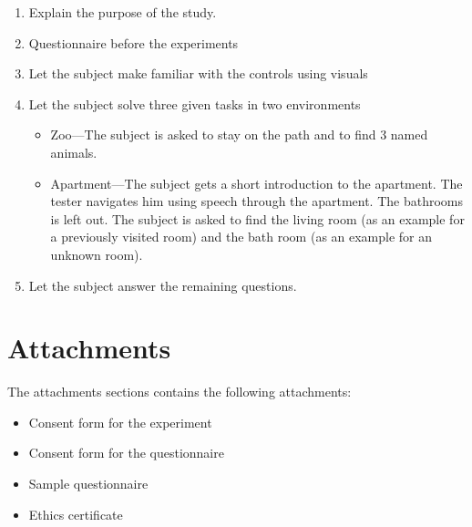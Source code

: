 \documentclass{article}
\begin{document}
\begin{enumerate}
  \item Explain the purpose of the study.
  \item Questionnaire before the experiments
  \item Let the subject make familiar with the controls using visuals
  \item Let the subject solve three given tasks in two environments
  \begin{itemize}
  \item Zoo---The subject is asked to stay on the path and to find 3 named
  animals.
  \item Apartment---The subject gets a short introduction to the apartment. The
  tester navigates him using speech through the apartment. The bathrooms is
  left out. The subject is asked to find the living room (as an example for a
  previously visited room) and the bath room (as an example for an unknown
  room).
  \end{itemize}
  \item Let the subject answer the remaining questions.
\end{enumerate}




\clearpage
\appendix
\section{Attachments}
The attachments sections contains the following attachments:
\begin{itemize}
  \item Consent form for the experiment
  \item Consent form for the questionnaire
  \item Sample questionnaire
  \item Ethics certificate
\end{itemize}





\end{document}
